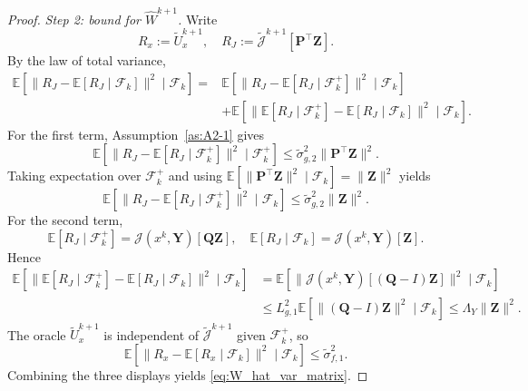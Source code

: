 \documentclass{pkumelon}
\theoremstyle{plain}
\newcommand{\E}{\mathbb{E}}
\begin{document}
\begin{proof}
\emph{Step 2: bound for $\widehat W^{k+1}$.} Write
\begin{equation*}
R_x:=\tilde U_x^{k+1}, \quad R_J:=\tilde{\mathcal J}^{k+1}[\boldsymbol P^\top\boldsymbol Z].
\end{equation*}
By the law of total variance,
\begin{equation*}
\begin{aligned}
\E[\|R_J-\E[R_J\mid \mathcal F_k]\|^2\mid \mathcal F_k]
={}&
\E[\|R_J-\E[R_J\mid \mathcal F_k^+]\|^2\mid \mathcal F_k] \\
&+
\E[\|\E[R_J\mid \mathcal F_k^+]-\E[R_J\mid \mathcal F_k]\|^2\mid \mathcal F_k].
\end{aligned}
\end{equation*}
For the first term, Assumption~\ref{as:A2-1} gives
\begin{equation*}
\E[\|R_J-\E[R_J\mid \mathcal F_k^+]\|^2\mid \mathcal F_k^+] \le \tilde\sigma_{g,2}^2\|\boldsymbol P^\top\boldsymbol Z\|^2.
\end{equation*}
Taking expectation over $\mathcal F_k^+$ and using $\E[\|\boldsymbol P^\top\boldsymbol Z\|^2\mid\mathcal F_k]=\|\boldsymbol Z\|^2$ yields
\begin{equation*}
\E[\|R_J-\E[R_J\mid \mathcal F_k^+]\|^2\mid \mathcal F_k] \le \tilde\sigma_{g,2}^2\|\boldsymbol Z\|^2.
\end{equation*}
For the second term,
\begin{equation*}
\E[R_J\mid \mathcal F_k^+]=\mathcal J(x^k,\boldsymbol Y)[\boldsymbol Q\boldsymbol Z], \quad \E[R_J\mid \mathcal F_k]=\mathcal J(x^k,\boldsymbol Y)[\boldsymbol Z].
\end{equation*}
Hence
\begin{equation*}
\begin{aligned}
\E[\|\E[R_J\mid \mathcal F_k^+]-\E[R_J\mid \mathcal F_k]\|^2\mid \mathcal F_k]
&=
\E[\|\mathcal J(x^k,\boldsymbol Y)[(\boldsymbol Q-I)\boldsymbol Z]\|^2\mid \mathcal F_k] \\
&\le
L_{g,1}^2\E[\|(\boldsymbol Q-I)\boldsymbol Z\|^2\mid \mathcal F_k] \le \Lambda_Y\|\boldsymbol Z\|^2.
\end{aligned}
\end{equation*}
The oracle $\tilde U_x^{k+1}$ is independent of $\tilde{\mathcal J}^{k+1}$ given $\mathcal F_k^+$, so
\begin{equation*}
\E[\|R_x-\E[R_x\mid \mathcal F_k]\|^2\mid \mathcal F_k]\le \tilde\sigma_{f,1}^2.
\end{equation*}
Combining the three displays yields \eqref{eq:W_hat_var_matrix}.


\end{proof}
\end{document}
